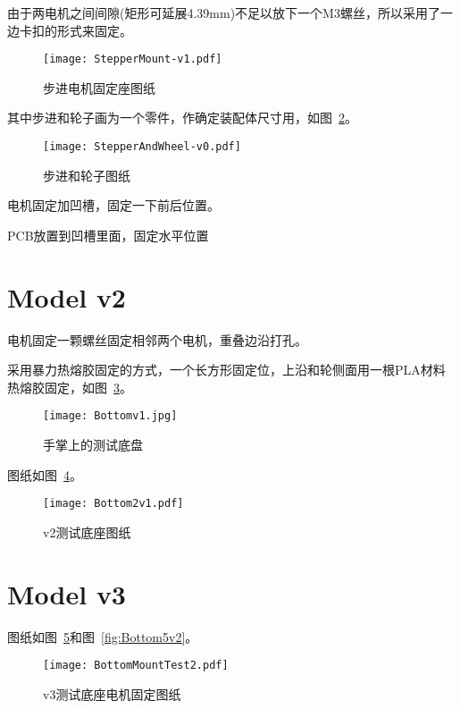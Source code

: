 由于两电机之间间隙(矩形可延展4.39mm)不足以放下一个M3螺丝，所以采用了一边卡扣的形式来固定。

\begin{figure}[htbp]
    \centering
    \texttt{[image: StepperMount-v1.pdf]}
    \caption{步进电机固定座图纸}
    \label{fig:StepperMount-v1-Datasheet}
\end{figure}

其中步进和轮子画为一个零件，作确定装配体尺寸用，如图~\ref{fig:StepperAndWheel-v0-Datasheet}。

\begin{figure}[htbp]
    \centering
    \texttt{[image: StepperAndWheel-v0.pdf]}
    \caption{步进和轮子图纸}
    \label{fig:StepperAndWheel-v0-Datasheet}
\end{figure}


电机固定加凹槽，固定一下前后位置。

PCB放置到凹槽里面，固定水平位置


\section{Model v2}

电机固定一颗螺丝固定相邻两个电机，重叠边沿打孔。

采用暴力热熔胶固定的方式，一个长方形固定位，上沿和轮侧面用一根PLA材料热熔胶固定，如图~\ref{fig:Bottomv1}。

\begin{figure}[htbp]
    \centering
    \texttt{[image: Bottomv1.jpg]}
    \caption{手掌上的测试底盘}
    \label{fig:Bottomv1}
\end{figure}

图纸如图~\ref{fig:Bottom2v1}。

\begin{figure}[htbp]
    \centering
    \texttt{[image: Bottom2v1.pdf]}
    \caption{v2测试底座图纸}
    \label{fig:Bottom2v1}
\end{figure}

\section{Model v3}

图纸如图~\ref{fig:BottomMountTest2}和图~\ref{fig:Bottom5v2}。

\begin{figure}[htbp]
    \centering
    \texttt{[image: BottomMountTest2.pdf]}
    \caption{v3测试底座电机固定图纸}
    \label{fig:BottomMountTest2}
\end{figure}

